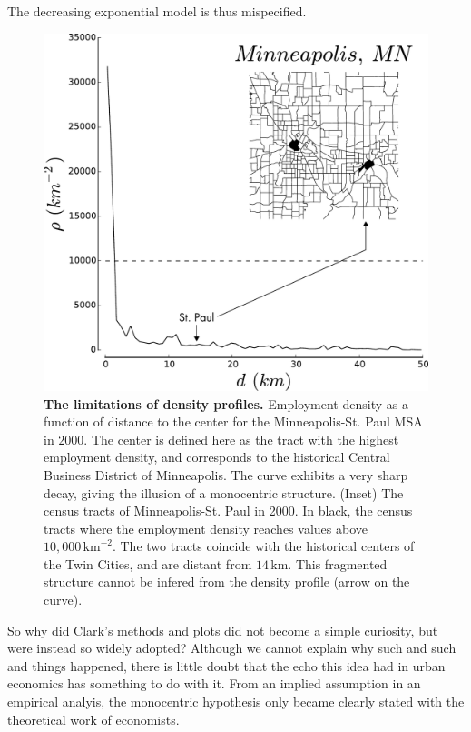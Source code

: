 The decreasing exponential model is thus mispecified.


\begin{figure}
    \centering
    \includegraphics[width=\textwidth]{./gfx/chapter-monocentric/distance_center_minneapolis.pdf}
    \caption{{\bf The limitations of density profiles.} Employment density as a function of distance to the center for the
    Minneapolis-St. Paul MSA in $2000$. The center is defined here as the
    tract with the highest employment density, and corresponds to the historical
    Central Business District of Minneapolis. The curve exhibits a very sharp
    decay, giving the illusion of a monocentric structure. (Inset) The census tracts
    of Minneapolis-St. Paul in 2000. In black, the census tracts where the
    employment density reaches values above $10,000\,\text{km}^{-2}$. The two tracts
    coincide with the historical centers of the Twin Cities, and are distant from
    $14\,\text{km}$. This fragmented structure cannot be infered from the density
    profile (arrow on the curve).
    \label{fig:distance_center_minneapolis}}
\end{figure}


So why did Clark's methods and plots did not become a simple curiosity, but were
instead so widely adopted? Although we cannot explain why such and such and
things happened, there is little doubt that the echo this idea had in urban
economics has something to do with it. From an implied assumption in an
empirical analyis, the monocentric hypothesis only became clearly stated with
the theoretical work of economists.


